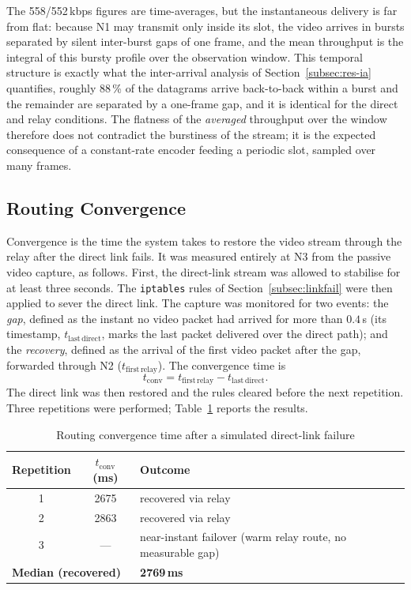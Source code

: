The 558/552\,kbps figures are time-averages, but the instantaneous delivery is
far from flat: because N1 may transmit only inside its slot, the video arrives
in bursts separated by silent inter-burst gaps of one frame, and the mean
throughput is the integral of this bursty profile over the observation window.
This temporal structure is exactly what the inter-arrival analysis of
Section~\ref{subsec:res-ia} quantifies, roughly 88\,\% of the datagrams
arrive back-to-back within a burst and the remainder are separated by a
one-frame gap, and it is identical for the direct and relay conditions. The
flatness of the \emph{averaged} throughput over the window therefore does not
contradict the burstiness of the stream; it is the expected consequence of a
constant-rate encoder feeding a periodic slot, sampled over many frames.

\subsection{Routing Convergence}
\label{subsec:res-convergence}

Convergence is the time the system takes to restore the video stream through
the relay after the direct link fails. It was measured entirely at N3 from the
passive video capture, as follows. First, the direct-link stream was allowed
to stabilise for at least three seconds. The \texttt{iptables} rules of
Section~\ref{subsec:linkfail} were then applied to sever the direct link. The
capture was monitored for two events: the \emph{gap}, defined as the instant
no video packet had arrived for more than $0.4$\,s (its timestamp,
$t_{\mathrm{last\,direct}}$, marks the last packet delivered over the direct
path); and the \emph{recovery}, defined as the arrival of the first video
packet after the gap, forwarded through N2 ($t_{\mathrm{first\,relay}}$). The
convergence time is
\begin{equation}
t_{\mathrm{conv}} = t_{\mathrm{first\,relay}} - t_{\mathrm{last\,direct}}.
\label{eq:tconv}
\end{equation}
The direct link was then restored and the rules cleared before the next
repetition. Three repetitions were performed; Table~\ref{tab:convergence}
reports the results.

\vspace{0.4cm}
\begin{table}[h]
\centering
\caption{Routing convergence time after a simulated direct-link failure}
\label{tab:convergence}
\begin{tabular}{ccl}
\toprule
\textbf{Repetition} & \textbf{$t_{\mathrm{conv}}$ (ms)} & \textbf{Outcome} \\
\midrule
1 & 2675 & recovered via relay \\
2 & 2863 & recovered via relay \\
3 & ---  & near-instant failover (warm relay route, no measurable gap) \\
\midrule
\multicolumn{2}{l}{\textbf{Median (recovered)}} & \textbf{2769\,ms} \\
\bottomrule
\end{tabular}
\end{table}
\vspace{0.5cm}

